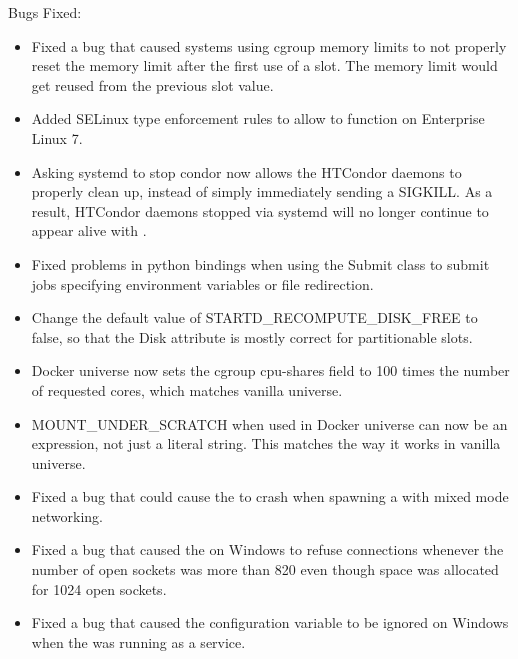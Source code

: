 \noindent Bugs Fixed:

\begin{itemize}

\item Fixed a bug that caused systems using cgroup memory limits to
not properly reset the memory limit after the first use of a slot.  The memory
limit would get reused from the previous slot value.

\item Added SELinux type enforcement rules to allow 
to function on Enterprise Linux 7.

\item Asking systemd to stop condor now allows the HTCondor daemons to properly
clean up, instead of simply immediately sending a SIGKILL.  As a result,
HTCondor daemons stopped via systemd will no longer continue to appear
alive with .

\item Fixed problems in python bindings when using the Submit class
to submit jobs specifying environment variables or file redirection.

\item Change the default value of STARTD\_RECOMPUTE\_DISK\_FREE to false, so
that the Disk attribute is mostly correct for partitionable slots.

\item Docker universe now sets the cgroup cpu-shares field to 100 times the
number of requested cores, which matches vanilla universe.

\item MOUNT\_UNDER\_SCRATCH when used in Docker universe can now be an
expression, not just a literal string.
This matches the way it works in vanilla universe.

\item Fixed a bug that could cause the  to crash when spawning
a  with mixed mode networking.

\item Fixed a bug that caused the  on Windows to refuse
connections whenever the number of open sockets was more than 820 even though
space was allocated for 1024 open sockets.

\item Fixed a bug that caused the configuration variable
 to be ignored on Windows when the
 was running as a service.


\end{itemize}
